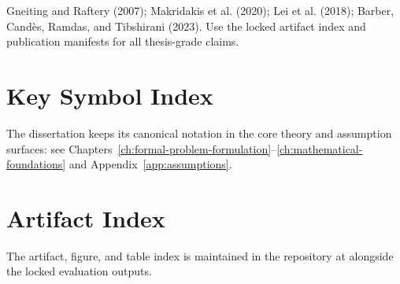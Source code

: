 \begin{description}[style=nextline]
\item[Reproducibility and Scientific Software]
  Gneiting and Raftery (2007); Makridakis et al. (2020); Lei et al. (2018); Barber, Cand\`{e}s, Ramdas, and Tibshirani (2023).
  Use the locked artifact index and publication manifests for all thesis-grade claims.

\end{description}

\section*{Key Symbol Index}

The dissertation keeps its canonical notation in the core theory and assumption surfaces:
see Chapters~\ref{ch:formal-problem-formulation}--\ref{ch:mathematical-foundations} and
Appendix~\ref{app:assumptions}.

\section*{Artifact Index}

The artifact, figure, and table index is maintained in the repository at
 alongside the locked evaluation outputs.

